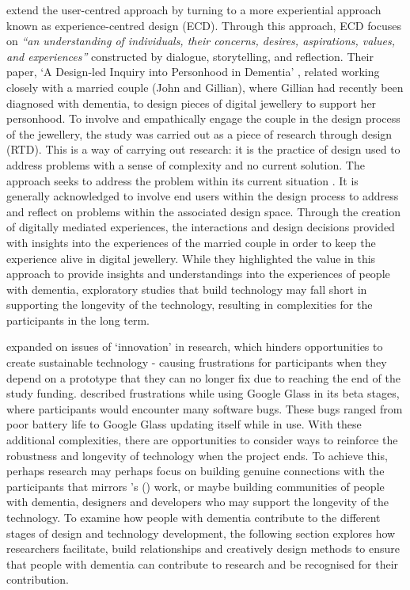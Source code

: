 \cite{wallace_design-led_2013} extend the user-centred approach by turning to a more experiential approach known as experience-centred design (ECD). Through this approach, ECD focuses on \textit{``an understanding of individuals, their concerns, desires, aspirations, values, and experiences''} \citep{morrissey_value_2017} constructed by dialogue, storytelling, and reflection. Their paper, `A Design-led Inquiry into Personhood in Dementia' \citep{wallace_design-led_2013}, related working closely with a married couple (John and Gillian), where Gillian had recently been diagnosed with dementia, to design pieces of digital jewellery to support her personhood. To involve and empathically engage the couple in the design process of the jewellery, the study was carried out as a piece of research through design (RTD). This is a way of carrying out research: it is the practice of design used to address problems with a sense of complexity and no current solution. The approach seeks to address the problem within its current situation \citep{zimmerman_research_2007}. It is generally acknowledged to involve end users within the design process to address and reflect on problems within the associated design space. Through the creation of digitally mediated experiences, the interactions and design decisions provided \cite{wallace_design-led_2013} with insights into the experiences of the married couple in order to keep the experience alive in digital jewellery. While they highlighted the value in this approach to provide insights and understandings into the experiences of people with dementia, exploratory studies that build technology may fall short in supporting the longevity of the technology, resulting in complexities for the participants in the long term. 

\cite{meurer_designing_2018} expanded on issues of `innovation' in research, which hinders opportunities to create sustainable technology - causing frustrations for participants when they depend on a prototype that they can no longer fix due to reaching the end of the study funding. \cite{vines_our_2017} described frustrations while using Google Glass in its beta stages, where participants would encounter many software bugs. These bugs ranged from poor battery life to Google Glass updating itself while in use. With these additional complexities, there are opportunities to consider ways to reinforce the robustness and longevity of technology when the project ends. To achieve this, perhaps research may perhaps focus on building genuine connections with the participants that mirrors \citeauthor{wallace_design-led_2013}'s (\citeyear{wallace_design-led_2013}) work, or maybe building communities of people with dementia, designers and developers who may support the longevity of the technology. To examine how people with dementia contribute to the different stages of design and technology development, the following section explores how researchers facilitate, build relationships and creatively design methods to ensure that people with dementia can contribute to research and be recognised for their contribution.

